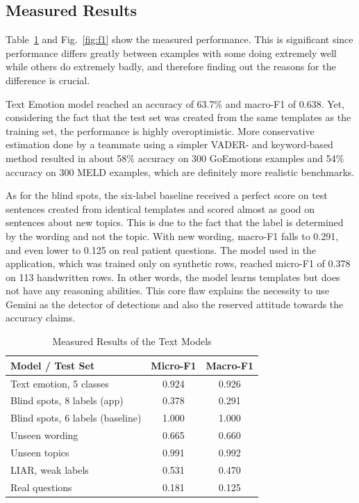 \documentclass[conference]{IEEEtran}
\begin{document}
\subsection{Measured Results}
Table~\ref{tab:results} and Fig.~\ref{fig:f1} show the measured performance. This is significant since performance differs greatly between examples with some doing extremely well while others do extremely badly, and therefore finding out the reasons for the difference is crucial.

Text Emotion model reached an accuracy of 63.7\% and macro-F1 of 0.638. Yet, considering the fact that the test set was created from the same templates as the training set, the performance is highly overoptimistic. More conservative estimation done by a teammate using a simpler VADER- and keyword-based method resulted in about 58\% accuracy on 300 GoEmotions examples and 54\% accuracy on 300 MELD examples, which are definitely more realistic benchmarks.

As for the blind spots, the six-label baseline received a perfect score on test sentences created from identical templates and scored almost as good on sentences about new topics. This is due to the fact that the label is determined by the wording and not the topic. With new wording, macro-F1 falls to 0.291, and even lower to 0.125 on real patient questions. The model used in the application, which was trained only on synthetic rows, reached micro-F1 of 0.378 on 113 handwritten rows. In other words, the model learns templates but does not have any reasoning abilities. This core flaw explains the necessity to use Gemini as the detector of detections and also the reserved attitude towards the accuracy claims.

\begin{table}[htbp]
\caption{Measured Results of the Text Models}
\label{tab:results}
\begin{center}
\small
\begin{tabular}{|l|c|c|}
\hline
\textbf{Model / Test Set} & \textbf{Micro-F1} & \textbf{Macro-F1} \\
\hline
Text emotion, 5 classes & 0.924 & 0.926 \\
Blind spots, 8 labels (app) & 0.378 & 0.291 \\
Blind spots, 6 labels (baseline) & 1.000 & 1.000 \\
Unseen wording & 0.665 & 0.660 \\
Unseen topics & 0.991 & 0.992 \\
LIAR, weak labels & 0.531 & 0.470 \\
Real questions & 0.181 & 0.125 \\
\hline
\end{tabular}
\end{center}
\end{table}
\end{document}

